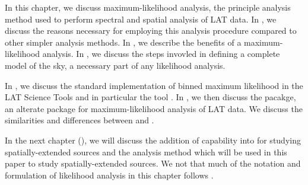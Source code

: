 
In this chapter, we discuss maximum-likelihood analysis, the principle
analysis method used to perform spectral and spatial analysis of
LAT data.  In , we discuss the
reasons necessary for employing this analysis procedure compared to other
simpler analysis methods.  In ,
we describe the benefits of a maximum-likelihood analysis.
In , we discuss the steps invovled in defining
a complete model of the sky, a necessary part of any likelihood analysis.

In , we discuss the standard implementation
of binned maximum likelihood in the LAT Science Tools and in particular
the tool \gtlike.
In , we then discuss the \pointlike pacakge,
an alterate package for maximum-likelihood analysis of LAT data. We
discuss the similarities and differences between \pointlike and \gtlike.

In the next chapter (),
we will discuss the addition of capability into \pointlike
for studying spatially-extended sources and the
analysis method which will be used in this paper to study
spatially-extended sources.
We not that much of the notation and formulation of likelihood
analysis in this chapter follows \cite{kerr_2010a_likelihood-methods}.


